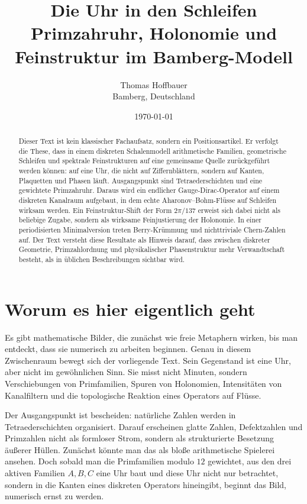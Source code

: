 \documentclass[11pt,a4paper]{article}
\title{Die Uhr in den Schleifen\\
	\large Primzahruhr, Holonomie und Feinstruktur im Bamberg-Modell}
\author{Thomas Hoffbauer\\Bamberg, Deutschland}
\date{\today}
\theoremstyle{remark}
\begin{document}
	\maketitle
	
	\begin{abstract}
		Dieser Text ist kein klassischer Fachaufsatz, sondern ein Positionsartikel. Er verfolgt die These, dass in einem diskreten Schalenmodell arithmetische Familien, geometrische Schleifen und spektrale Feinstrukturen auf eine gemeinsame Quelle zurückgeführt werden können: auf eine Uhr, die nicht auf Ziffernblättern, sondern auf Kanten, Plaquetten und Phasen läuft. Ausgangspunkt sind Tetraederschichten und eine gewichtete Primzahruhr. Daraus wird ein endlicher Gauge-Dirac-Operator auf einem diskreten Kanalraum aufgebaut, in dem echte Aharonov--Bohm-Flüsse auf Schleifen wirksam werden. Ein Feinstruktur-Shift der Form $2\pi/137$ erweist sich dabei nicht als beliebige Zugabe, sondern als wirksame Feinjus­tierung der Holonomie. In einer periodisierten Minimalversion treten Berry-Krümmung und nichttriviale Chern-Zahlen auf. Der Text versteht diese Resultate als Hinweis darauf, dass zwischen diskreter Geometrie, Primzahlordnung und physikalischer Phasenstruktur mehr Verwandtschaft besteht, als in üblichen Beschreibungen sichtbar wird.
	\end{abstract}
	
	\section{Worum es hier eigentlich geht}
	
	Es gibt mathematische Bilder, die zunächst wie freie Metaphern wirken, bis man entdeckt, dass sie numerisch zu arbeiten beginnen. Genau in diesem Zwischenraum bewegt sich der vorliegende Text. Sein Gegenstand ist eine Uhr, aber nicht im gewöhnlichen Sinn. Sie misst nicht Minuten, sondern Verschiebungen von Primfamilien, Spuren von Holonomien, Intensitäten von Kanalfiltern und die topologische Reaktion eines Operators auf Flüsse.
	
	Der Ausgangspunkt ist bescheiden: natürliche Zahlen werden in Tetraederschichten organisiert. Darauf erscheinen glatte Zahlen, Defektzahlen und Primzahlen nicht als formloser Strom, sondern als strukturierte Besetzung äußerer Hüllen. Zunächst könnte man das als bloße arithmetische Spielerei ansehen. Doch sobald man die Primfamilien modulo $12$ gewichtet, aus den drei aktiven Familien $A,B,C$ eine Uhr baut und diese Uhr nicht nur betrachtet, sondern in die Kanten eines diskreten Operators hineingibt, beginnt das Bild, numerisch ernst zu werden.
	
\end{document}
